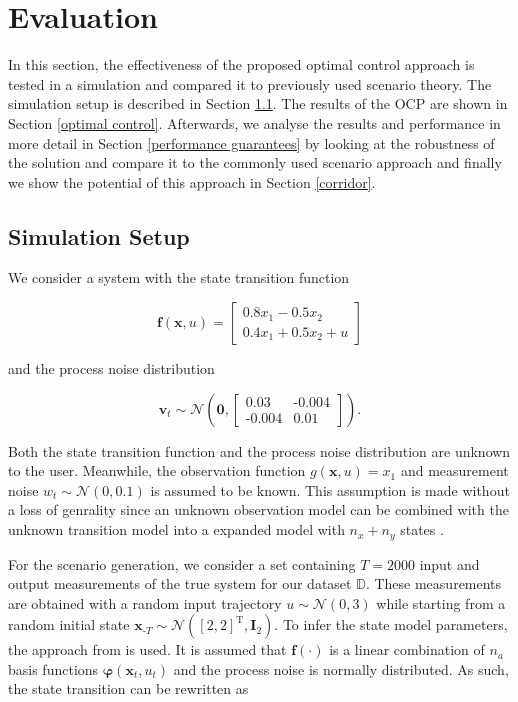 \chapter{Evaluation} \label{Evaluation}

In this section, the effectiveness of the proposed optimal control approach is tested in a simulation and compared it to previously used scenario theory. The simulation setup is described in Section \ref{Setup}. The results of the OCP are shown in Section \ref{optimal control}. Afterwards, we analyse the results and performance in more detail in Section \ref{performance guarantees} by looking at the robustness of the solution and compare it to the commonly used scenario approach and finally we show the potential of this approach in Section \ref{corridor}.

\section{Simulation Setup} \label{Setup}

We consider a system with the state transition function

\begin{equation} \label{linear system}
\boldsymbol{f}(\boldsymbol{x}, u) = 
\begin{bmatrix}
0.8  x_1 - 0.5 x_2 \\
0.4 x_1 + 0.5 x_2 + u
\end{bmatrix}
\end{equation}

and the process noise distribution

\begin{equation}
\boldsymbol{v}_t \sim \mathcal{N} \left(\boldsymbol{0}, 
\begin{bmatrix}
0.03 & \text{-}0.004 \\
\text{-}0.004 & 0.01
\end{bmatrix}
\right).
\end{equation}

Both the state transition function and the process noise distribution are unknown to the user. Meanwhile, the observation function $g(\boldsymbol{x}, u) = x_1$ and measurement noise $w_t \sim \mathcal{N} (0, 0.1)$ is assumed to be known. This assumption is made without a loss of genrality since an unknown observation model can be combined with the unknown transition model into a expanded model with $n_x + n_y$ states \cite{Frigola_15}.


For the scenario generation, we consider a set containing $T = 2000$ input and output measurements of the true system for our dataset $\mathbb{D}$. These measurements are obtained with a random input trajectory $u \sim \mathcal{N} (0, 3)$ while starting from a random initial state $\boldsymbol{x}_{\text{-}T} \sim \mathcal{N} ([2, 2]^\text{T}, \boldsymbol{I}_2)$. To infer the state model parameters, the approach from \cite{Svensson_17} is used. It is assumed that $\boldsymbol{f}(\cdot)$ is a linear combination of $n_a$ basis functions $\boldsymbol{\varphi}(\boldsymbol{x}_t, u_t)$ and the process noise is normally distributed. As such, the state transition can be rewritten as

